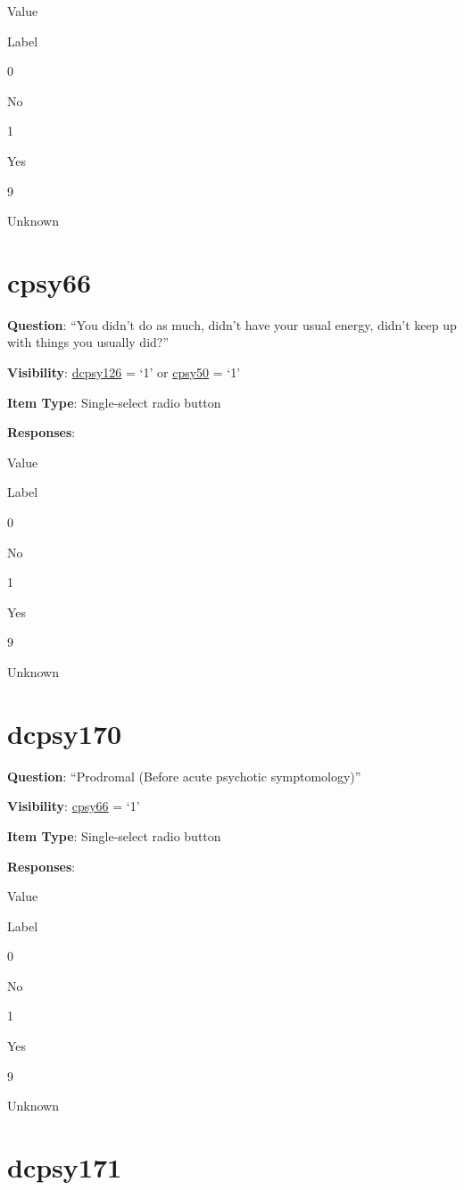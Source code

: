 \documentclass[]{book}
\begin{document}
Value

Label

0

No

1

Yes

9

Unknown

\hypertarget{cpsy66}{%
\section{cpsy66}\label{cpsy66}}

\textbf{Question}: ``You didn't do as much, didn't have your usual energy, didn't keep up with things you usually did?''

\textbf{Visibility}: \protect\hyperlink{dcpsy126}{dcpsy126} = `1' or \protect\hyperlink{cpsy50}{cpsy50} = `1'

\textbf{Item Type}: Single-select radio button

\textbf{Responses}:

Value

Label

0

No

1

Yes

9

Unknown

\hypertarget{dcpsy170}{%
\section{dcpsy170}\label{dcpsy170}}

\textbf{Question}: ``Prodromal (Before acute psychotic symptomology)''

\textbf{Visibility}: \protect\hyperlink{cpsy66}{cpsy66} = `1'

\textbf{Item Type}: Single-select radio button

\textbf{Responses}:

Value

Label

0

No

1

Yes

9

Unknown

\hypertarget{dcpsy171}{%
\section{dcpsy171}\label{dcpsy171}}
\end{document}
